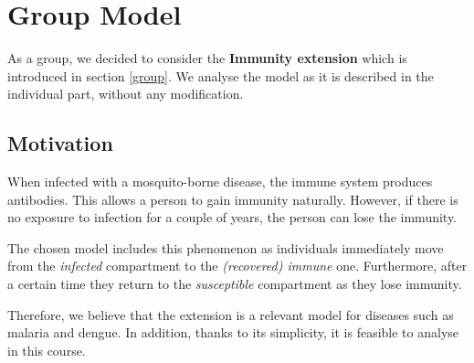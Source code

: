 \section{Group Model}

As a group, we decided to consider the \textbf{Immunity extension} which is introduced in section \ref{group}. We analyse the model as it is described in the individual part, without any modification.

\subsection*{Motivation}

When infected with a mosquito-borne disease, the immune system produces antibodies. This allows a person to gain immunity naturally. However, if there is no exposure to infection for a couple of years, the person can lose the immunity.

The chosen model includes this phenomenon as individuals immediately move from the \textit{infected} compartment to the \textit{(recovered) immune} one. Furthermore, after a certain time they return to the \textit{susceptible} compartment as they lose immunity.

Therefore, we believe that the extension is a relevant model for diseases such as malaria and dengue. In addition, thanks to its simplicity, it is feasible to analyse in this course. 

